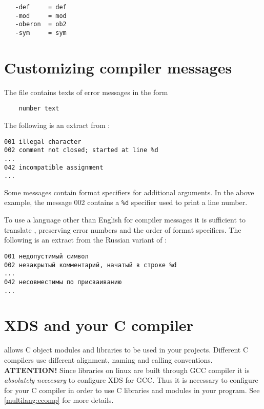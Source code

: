 \begin{verbatim}
   -def     = def
   -mod     = mod
   -oberon  = ob2
   -sym     = sym
\end{verbatim}

\section{Customizing compiler messages}\label{xc:msg}

The file {\tt \msg} contains texts of error messages in the form

\verb'    number text'

The following is an extract from \msg{}:
\begin{verbatim}
001 illegal character
002 comment not closed; started at line %d
...
042 incompatible assignment
...
\end{verbatim}
Some messages contain format specifiers
for additional arguments. In the above example, the message 002
contains a \verb|%d| specifier used to print a line number.

To use a language other than English for compiler messages
it is sufficient to translate \msg,  preserving error
numbers and the order of format specifiers.
\ifcomment
The following is an extract from the Russian
variant of \msg{}:
\begin{verbatim}
001 недопустимый символ
002 незакрытый комментарий, начатый в строке %d
...
042 несовместимы по присваиванию
...
\end{verbatim}
\fi

\section{XDS and your C compiler}\label{config:C}

\ifgencode %

  \xds{} allows C object modules and libraries to be used in your projects.
  Different C compilers use different alignment, naming and calling conventions.
  \iflinux
    {\bf ATTENTION!} Since \xds{} libraries on linux are built through GCC
    compiler it is {\em absolutely neccesary} to configure XDS for GCC.
  \else %
    Thus it is necessary to configure \xds{} for your C compiler in order
    to use C libraries and modules in your program.
  \fi  %
  See \ref{multilang:ccomp} for more details.
\fi  %

